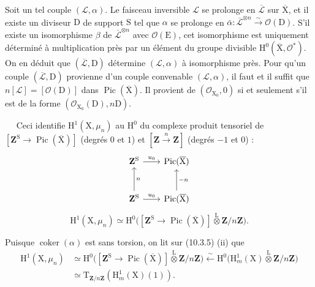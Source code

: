 \documentclass[11pt,leqno]{article}
\newcommand{\Page}[1]{\ifvmode\noindent\else\unskip\ \fi{\footnotesize\textcolor{gray}{[p.\,#1]}}\ \ignorespaces}
\begin{document}
Soit un tel couple \((\mathcal{L},\alpha)\). Le faisceau inversible \(\mathcal{L}\) se prolonge en \(\overline{\mathcal{L}}\) sur \(\overline{\mathrm{X}}\), et il existe un diviseur \(\mathrm{D}\) de support \(\mathrm{S}\) tel que \(\alpha\) se prolonge en \(\bar\alpha:\overline{\mathcal{L}}^{\otimes n}\xrightarrow{\sim}\mathcal{O}(\mathrm{D})\). S’il existe un isomorphisme \(\beta\) de \(\overline{\mathcal{L}}^{\otimes n}\) avec \(\mathcal{O}(\mathrm{E})\), cet isomorphisme est uniquement déterminé à multiplication près par un élément du groupe divisible \(\mathrm{H}^{0}(\overline{\mathrm{X}},\mathcal{O}^{*})\). On en déduit que \((\overline{\mathcal{L}},\mathrm{D})\) détermine \((\mathcal{L},\alpha)\) à isomorphisme près. Pour qu’un couple \((\overline{\mathcal{L}},\mathrm{D})\) provienne d’un couple convenable \((\mathcal{L},\alpha)\), il faut et il suffit que \(n[\mathcal{L}]=[\mathcal{O}(\mathrm{D})]\) dans \(\operatorname{Pic}(\overline{\mathrm{X}})\). Il provient de \((\mathcal{O}_{\mathrm{X}_0},0)\) si et seulement s’il est de la forme \((\mathcal{O}_{\mathrm{X}_0}(\mathrm{D}),n\mathrm{D})\).

\Page{71}
Ceci identifie \(\mathrm{H}^{1}(\mathrm{X},\mu_n)\) au \(\mathrm{H}^{0}\) du complexe produit tensoriel de \([\mathbf{Z}^{\mathrm{S}}\to\operatorname{Pic}(\overline{\mathrm{X}})]\) (degrés \(0\) et \(1\)) et \([\mathbf{Z}\xrightarrow{n}\mathbf{Z}]\) (degrés \(-1\) et \(0\)) :
\[
\begin{tikzcd}[column sep=2em,row sep=2.5em]
\mathbf{Z}^{\mathrm{S}} \arrow[r,"u_0"]
 & \operatorname{Pic}(\overline{\mathrm{X}})\\
\mathbf{Z}^{\mathrm{S}} \arrow[r,"u_0"] \arrow[u,"n"']
 & \operatorname{Pic}(\overline{\mathrm{X}}) \arrow[u,"-n"']
\end{tikzcd}
\]
\[
\mathrm{H}^{1}(\mathrm{X},\mu_n)
\simeq
\mathrm{H}^{0}\bigl(
[\mathbf{Z}^{\mathrm{S}}\to\operatorname{Pic}(\overline{\mathrm{X}})]
\overset{\mathrm{L}}{\otimes}\mathbf{Z}/n\mathbf{Z}\bigr).
\]

Puisque \(\operatorname{coker}(\alpha)\) est sans torsion, on lit sur (10.3.5) (ii) que
\[
\begin{aligned}
\mathrm{H}^{1}(\mathrm{X},\mu_n)
&\simeq
\mathrm{H}^{0}\bigl(
[\mathbf{Z}^{\mathrm{S}}\to\operatorname{Pic}(\overline{\mathrm{X}})]
\overset{\mathrm{L}}{\otimes}\mathbf{Z}/n\mathbf{Z}\bigr)
\xleftarrow{\sim}
\mathrm{H}^{0}\bigl(
\mathrm{H}^{1}_{m}(\mathrm{X})
\overset{\mathrm{L}}{\otimes}\mathbf{Z}/n\mathbf{Z}\bigr)\\
&\simeq
\mathrm{T}_{\mathbf{Z}/n\mathbf{Z}}(\mathrm{H}^{1}_{m}(\mathrm{X})(1)).
\end{aligned}
\]
\end{document}
